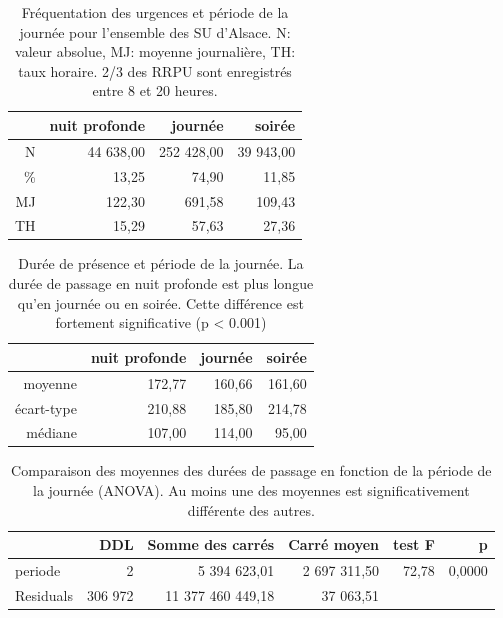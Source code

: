 \documentclass[12pt,english,french,twoside]{book}\usepackage[]{graphicx}\usepackage[]{color}
\begin{document}
\begin{table}[ht]
\centering
\begin{tabular}{rrrr}
  \hline
 & nuit profonde & journée & soirée \\ 
  \hline
N & 44 638,00 & 252 428,00 & 39 943,00 \\ 
  \% & 13,25 & 74,90 & 11,85 \\ 
  MJ & 122,30 & 691,58 & 109,43 \\ 
  TH & 15,29 & 57,63 & 27,36 \\ 
   \hline
\end{tabular}
\caption[Fréquentation des SU et période]{Fréquentation des urgences et période de la journée pour l'ensemble des SU d'Alsace. N: valeur absolue, MJ: moyenne journalière, TH: taux horaire. 2/3 des RRPU sont enregistrés entre 8 et 20 heures.} 
\label{tab:freq_periode}
\end{table}
\begin{table}[ht]
\centering
\begin{tabular}{rrrr}
  \hline
 & nuit profonde & journée & soirée \\ 
  \hline
moyenne & 172,77 & 160,66 & 161,60 \\ 
  écart-type & 210,88 & 185,80 & 214,78 \\ 
  médiane & 107,00 & 114,00 & 95,00 \\ 
   \hline
\end{tabular}
\caption[Durée de présence et période]{Durée de présence et période de la journée. La durée de passage en nuit profonde est plus longue qu'en journée ou en soirée. Cette différence est fortement significative (p < 0.001)} 
\label{duree_periode}
\end{table}
\begin{table}[ht]
\centering
\begin{tabular}{lrrrrr}
  \hline
 & DDL & Somme des carrés & Carré moyen & test F &  p \\ 
  \hline
periode & 2 & 5 394 623,01 & 2 697 311,50 & 72,78 & 0,0000 \\ 
  Residuals & 306 972 & 11 377 460 449,18 & 37 063,51 &  &  \\ 
   \hline
\end{tabular}
\caption{Comparaison des moyennes des durées de passage en fonction de la période de la journée (ANOVA). Au moins une des moyennes est significativement différente des autres.} 
\end{table}
\end{document}
